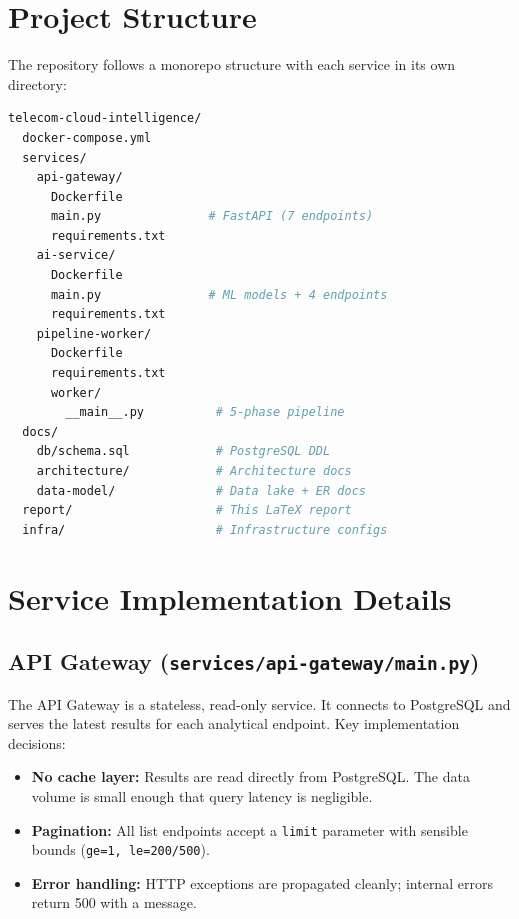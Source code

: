\section{Project Structure}

The repository follows a monorepo structure with each service in its own directory:

\begin{lstlisting}[language=bash, caption={Repository structure.}, label={lst:repo-structure}]
telecom-cloud-intelligence/
  docker-compose.yml
  services/
    api-gateway/
      Dockerfile
      main.py               # FastAPI (7 endpoints)
      requirements.txt
    ai-service/
      Dockerfile
      main.py               # ML models + 4 endpoints
      requirements.txt
    pipeline-worker/
      Dockerfile
      requirements.txt
      worker/
        __main__.py          # 5-phase pipeline
  docs/
    db/schema.sql            # PostgreSQL DDL
    architecture/            # Architecture docs
    data-model/              # Data lake + ER docs
  report/                    # This LaTeX report
  infra/                     # Infrastructure configs
\end{lstlisting}

\section{Service Implementation Details}

\subsection{API Gateway (\texttt{services/api-gateway/main.py})}

The API Gateway is a stateless, read-only service. It connects to PostgreSQL and serves the latest results for each analytical endpoint. Key implementation decisions:

\begin{itemize}
  \item \textbf{No cache layer:} Results are read directly from PostgreSQL. The data volume is small enough that query latency is negligible.
  \item \textbf{Pagination:} All list endpoints accept a \texttt{limit} parameter with sensible bounds (\texttt{ge=1, le=200/500}).
  \item \textbf{Error handling:} HTTP exceptions are propagated cleanly; internal errors return 500 with a message.
\end{itemize}

